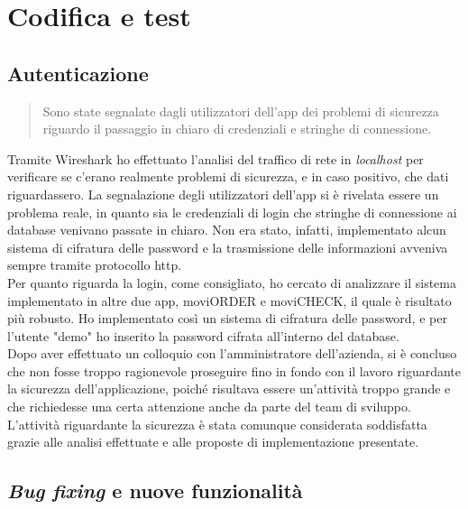 \chapter{Codifica e test}
\label{cap:codifica}


\section{Autenticazione}

\begin{quote}
    Sono state segnalate dagli utilizzatori dell'app dei problemi di sicurezza riguardo il passaggio in chiaro di credenziali e stringhe di connessione.
\end{quote}
\noindent Tramite Wireshark ho effettuato l'analisi del traffico di rete in \emph{localhost} per verificare se c'erano realmente problemi di sicurezza, e in caso positivo, che dati riguardassero. La segnalazione degli utilizzatori dell'app si è rivelata essere un problema reale, in quanto sia le credenziali di login che stringhe di connessione ai database venivano passate in chiaro. Non era stato, infatti, implementato alcun sistema di cifratura delle password e la trasmissione delle informazioni avveniva sempre tramite protocollo http.\\
Per quanto riguarda la login, come consigliato, ho cercato di analizzare il sistema implementato in altre due app, moviORDER e moviCHECK, il quale è risultato più robusto. Ho implementato così un sistema di cifratura delle password, e per l'utente "demo" ho inserito la password cifrata all'interno del database.\\
Dopo aver effettuato un colloquio con l'amministratore dell'azienda, si è concluso che non fosse troppo ragionevole proseguire fino in fondo con il lavoro riguardante la sicurezza dell'applicazione, poiché risultava essere un'attività troppo grande e che richiedesse una certa attenzione anche da parte del team di sviluppo. L'attività riguardante la sicurezza è stata comunque considerata soddisfatta grazie alle analisi effettuate e alle proposte di implementazione presentate.

\section{\emph{Bug fixing} e nuove funzionalità}

